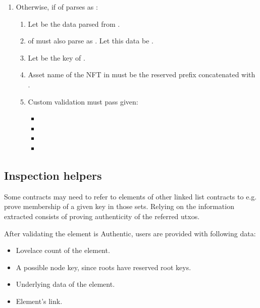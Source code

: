\documentclass[../midgard.tex]{subfiles}
\begin{document}
\begin{description}
\begin{enumerate}
\begin{enumerate}[resume]
\begin{itemize}
                \item {}
              \end{itemize}
          \end{enumerate}
        \item Otherwise, if  of  parses as :
          \begin{enumerate}[resume]
            \item Let  be the data parsed from .
            \item {} of  must also parse as .
              Let this data be .
            \item Let  be the key of .
            \item Asset name of the NFT in  must be the reserved prefix concatenated with .
            \item Custom validation must pass given:
              \begin{itemize}
                \item {}
                \item {}
                \item {}
                \item {}
              \end{itemize}
          \end{enumerate}
    \end{enumerate}
\end{description}

\subsection{Inspection helpers}
\label{h:list-inspection-helpers}

Some contracts may need to refer to elements of other linked list contracts to e.g. prove membership of a given key in those sets.
Relying on the information extracted consists of proving authenticity of the referred utxos.

After validating the element is Authentic, users are provided with following data:
\begin{itemize}
  \item Lovelace count of the element.
  \item A possible node key, since roots have reserved root keys.
  \item Underlying data of the element.
  \item Element's link.
\end{itemize}
\end{document}
